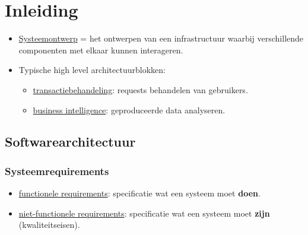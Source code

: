 \chapter{Inleiding}
	\begin{itemize}
		\item[\info] \underline{Systeemontwerp} = het ontwerpen van een infrastructuur waarbij verschillende componenten met elkaar kunnen interageren.
		\item[\info] Typische high level architectuurblokken: 
			\begin{itemize}
				\item[\info] \underline{transactiebehandeling}: requests behandelen van gebruikers.
				\item[\info] \underline{business intelligence}: geproduceerde data analyseren.
			\end{itemize}  
	\end{itemize}
	\section{Softwarearchitectuur}
	\subsection{Systeemrequirements}
	\begin{itemize}
		\item[\info] \underline{functionele requirements}: specificatie wat een systeem moet \textbf{doen}.
		\item[\info] \underline{niet-functionele requirements}: specificatie wat een systeem moet \textbf{zijn} (kwaliteitseisen).
	\end{itemize}

